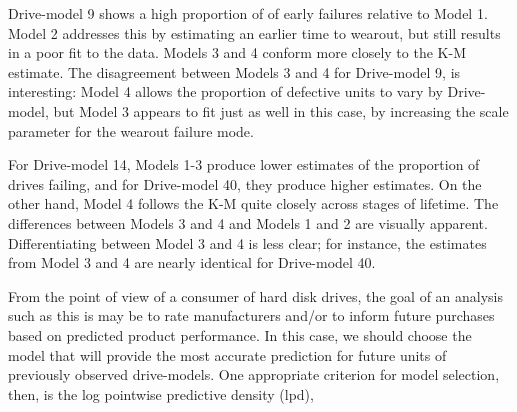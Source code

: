 \documentclass[aap]{imsart}
\begin{document}
Drive-model 9 shows a high proportion of  of early failures relative to Model 1. Model 2 addresses this by estimating an earlier time to wearout, but still results in a poor fit to the data. Models 3 and 4 conform more closely to the K-M estimate. The disagreement between Models 3 and 4 for Drive-model 9, is interesting: Model 4 allows the proportion of defective units to vary by Drive-model, but Model 3 appears to fit just as well in this case, by increasing the scale parameter for the wearout failure mode.

For Drive-model 14, Models 1-3 produce lower estimates of the proportion of drives failing, and for Drive-model 40, they produce higher estimates.  On the other hand, Model 4 follows the K-M quite closely across stages of lifetime.  The differences between Models 3 and 4 and Models 1 and 2 are visually apparent.  Differentiating between Model 3 and 4 is less clear; for instance, the estimates from Model 3 and 4 are nearly identical for Drive-model 40.



From the point of view of a consumer of hard disk drives, the goal of an analysis such as this is may be to rate manufacturers and/or to inform future purchases based on predicted product performance. In this case, we should choose the model that will provide the most accurate prediction for future units of previously observed drive-models. One appropriate criterion for model selection, then, is the log pointwise predictive density (lpd),
\end{document}
